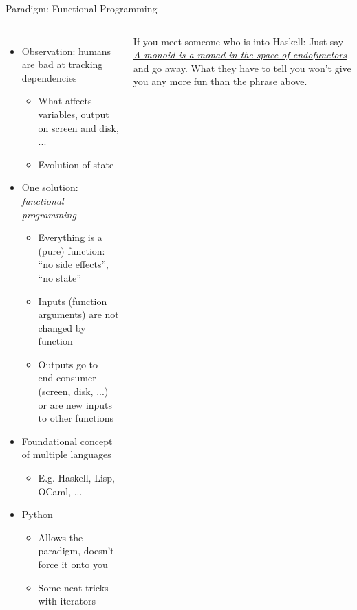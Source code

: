 \begin{frame}[fragile]{Paradigm: Functional Programming}
%
\begin{columns}[T]
\begin{itemize}
\item Observation: humans are bad at tracking dependencies
	\begin{itemize}
	\item What affects variables, output on screen and disk, ...
	\item[\Thus] Evolution of state
	\end{itemize}
\item One solution: \emph{functional programming}
	\begin{itemize}
	\item Everything is a (pure) function: \enquote{no side effects}, \enquote{no state}
	\item Inputs (\ie function arguments) are not changed by function
	\item Outputs go to end-consumer (screen, disk, ...) or are new inputs to other functions
	\end{itemize}
\item Foundational concept of multiple languages
	\begin{itemize}
	\item E.\;g. Haskell, Lisp, OCaml, ...
	\end{itemize}
\item Python
	\begin{itemize}
	\item Allows the paradigm, doesn't force it onto you
	\item Some neat tricks with iterators
	\end{itemize}
\end{itemize}
%
\begin{hintbox}[Haskell]
\small
If you meet someone who is into Haskell: Just say \href{https://youtu.be/H0Ek86IH-3Y}{\emph{A monoid is a monad in the space of endofunctors}} and go away. What they have to tell you won't give you any more fun than the phrase above.
\end{hintbox}
\end{columns}
%
\end{frame}


